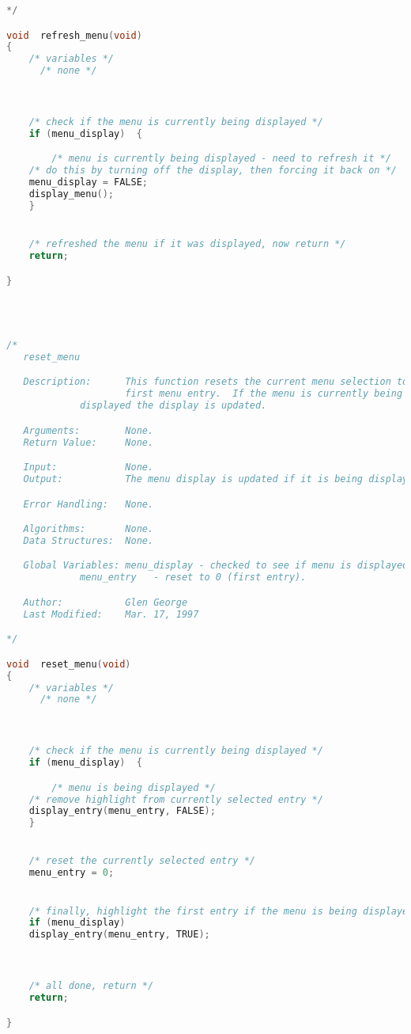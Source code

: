\begin{lstlisting}[language=C]
*/

void  refresh_menu(void)
{
    /* variables */
      /* none */



    /* check if the menu is currently being displayed */
    if (menu_display)  {

    	/* menu is currently being displayed - need to refresh it */
	/* do this by turning off the display, then forcing it back on */
	menu_display = FALSE;
	display_menu();
    }


    /* refreshed the menu if it was displayed, now return */
    return;

}




/*
   reset_menu

   Description:      This function resets the current menu selection to the
                     first menu entry.  If the menu is currently being
		     displayed the display is updated.

   Arguments:        None.
   Return Value:     None.

   Input:            None.
   Output:           The menu display is updated if it is being displayed.

   Error Handling:   None.

   Algorithms:       None.
   Data Structures:  None.

   Global Variables: menu_display - checked to see if menu is displayed.
   		     menu_entry   - reset to 0 (first entry).

   Author:           Glen George
   Last Modified:    Mar. 17, 1997

*/

void  reset_menu(void)
{
    /* variables */
      /* none */



    /* check if the menu is currently being displayed */
    if (menu_display)  {

        /* menu is being displayed */
	/* remove highlight from currently selected entry */
	display_entry(menu_entry, FALSE);
    }


    /* reset the currently selected entry */
    menu_entry = 0;


    /* finally, highlight the first entry if the menu is being displayed */
    if (menu_display)
	display_entry(menu_entry, TRUE);



    /* all done, return */
    return;

}





\end{lstlisting}
